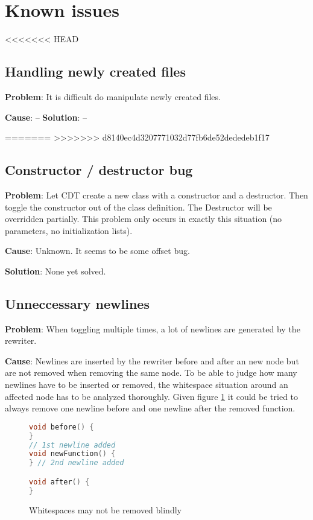 \section{Known issues}

<<<<<<< HEAD
\subsection{Handling newly created files}
\textbf{Problem}: It is difficult do manipulate newly created files.

\textbf{Cause}: --
\textbf{Solution}: --

=======
>>>>>>> d8140ec4d3207771032d77fb6de52dededeb1f17
\subsection{Constructor / destructor bug}
\textbf{Problem}: Let CDT create a new class with a constructor and a destructor. 
Then toggle the constructor out of the class definition. The Destructor will be 
overridden partially. This problem only occurs in exactly this situation (no 
parameters, no initialization lists).

\textbf{Cause}: Unknown. It seems to be some offset bug.

\textbf{Solution}: None yet solved.

\subsection{Unneccessary newlines}
\textbf{Problem}: When toggling multiple times, a lot of newlines are generated 
by the rewriter. 

\textbf{Cause}: Newlines are inserted by the rewriter before and after an new
node but are not removed when removing the same node. To be able to judge how 
many newlines have to be inserted or removed, the whitespace situation around an 
affected node has to be analyzed thoroughly. Given figure \ref{commentA} it 
could be tried to always remove one newline before and one newline after the 
removed function.

\begin{figure}[h]
\begin{lstlisting}[language=C++]
void before() {
}
// 1st newline added
void newFunction() {
} // 2nd newline added

void after() {
}
\end{lstlisting}
\setlength{\abovecaptionskip}{-20pt}
\caption{Whitespaces may not be removed blindly}
\label{commentA}
\end{figure}

